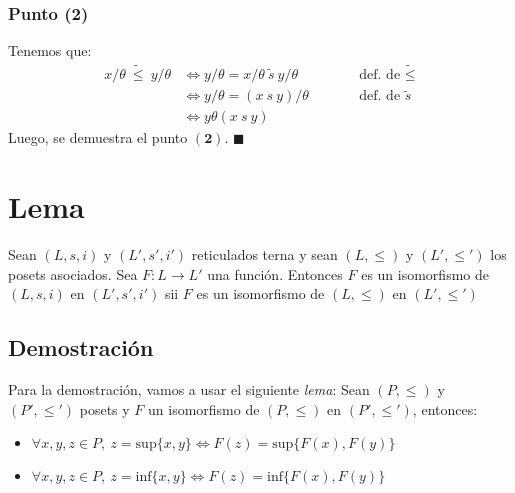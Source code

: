 \documentclass{article}
\begin{document}
\subsubsection*{Punto (2)}
Tenemos que:
\begin{equation*}
  \begin{alignedat}{2}
    x/\theta\ \tilde{\leq}\ y/\theta & \iff y/\theta=x/\theta\ \tilde{s}\ y/\theta &  & \qquad\text{def. de }\tilde{\leq} \\
                                     & \iff y/\theta = (x\ s\ y)/\theta            &  & \qquad\text{def. de }\tilde{s}    \\
                                     & \iff y\theta(x\ s\ y)
  \end{alignedat}
\end{equation*}
Luego, se demuestra el punto $\mathbf{(2)}$. $\blacksquare$

\section*{Lema}
Sean $(L,s,i)$ y $(L',s',i')$ reticulados terna y sean $(L,\leq)$ y $(L',\leq')$ los posets asociados. Sea $F:L\to L'$ una función. Entonces $F$ es un isomorfismo de $(L,s,i)$ en $(L',s',i')$ sii $F$ es un isomorfismo de $(L,\leq)$ en $(L',\leq')$
\subsection*{Demostración}
Para la demostración, vamos a usar el siguiente \textit{lema}: Sean $(P,\leq)$ y $(P',\leq')$ posets y $F$ un isomorfismo de $(P,\leq)$ en $(P',\leq')$, entonces:
\begin{itemize}
  \item $\forall x,y,z\in P,\ z=\text{sup}\{x,y\}\iff F(z)=\text{sup}\{F(x),F(y)\}$
  \item $\forall x,y,z\in P,\ z=\text{inf}\{x,y\}\iff F(z)=\text{inf}\{F(x),F(y)\}$
\end{itemize}
\end{document}
